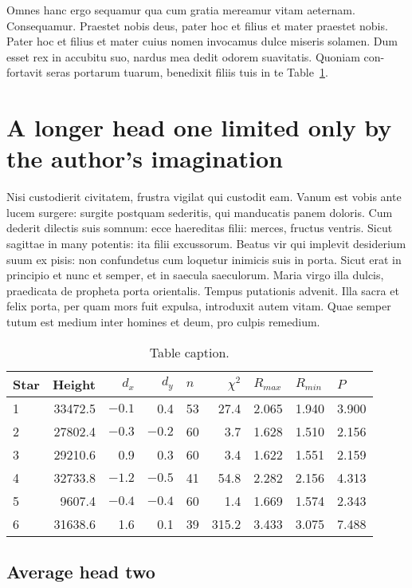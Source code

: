 \documentclass{arkiv}
\begin{document}
Omnes hanc ergo sequamur qua cum gratia mereamur vitam aeternam.
Consequamur. Praestet nobis deus, pater hoc et filius et mater
praestet nobis.  Pater hoc et filius et mater cuius nomen invocamus
dulce miseris solamen. Dum esset rex in accubitu suo, nardus mea
dedit odorem suavitatis. Quoniam con-fortavit seras portarum tuarum,
benedixit filiis tuis in te Table~\ref{tbl-2}.



\section{A longer head one limited only by the author's imagination}

Nisi custodierit civitatem, frustra vigilat qui custodit eam. Vanum
est vobis ante lucem surgere: surgite postquam sederitis, qui
manducatis panem doloris. Cum dederit dilectis suis somnum: ecce
haereditas filii: merces, fructus ventris. Sicut sagittae in many
potentis: ita filii excussorum. Beatus vir qui implevit desiderium
suum ex pisis: non confundetus cum loquetur inimicis suis in porta.
Sicut erat in principio et nunc et semper, et in saecula saeculorum.
Maria virgo illa dulcis, praedicata de propheta porta orientalis.
Tempus putationis advenit.  Illa sacra et felix porta, per quam mors
fuit expulsa, introduxit autem vitam.  Quae semper tutum est medium
inter homines et deum, pro culpis remedium.


\begin{table}
\caption{Table caption.}\label{tbl-2}
\begin{tabular}{lrrrlrlll}
\hline
Star &
Height &
$d_{x}$ &
$d_{y}$ &
$n$ &
$\chi^2$ &
$R_{max}$ &
$R_{min}$ &
$P$  \\
\hline
1 &33472.5 &$-0.1$ &0.4  &53 &27.4 &2.065  &1.940 &3.900\\
2 &27802.4 &$-0.3$ &$-0.2$ &60 &3.7  &1.628  &1.510 &2.156\\
3 &29210.6 &0.9  &0.3  &60 &3.4  &1.622  &1.551 &2.159\\
4 &32733.8 &$-1.2$ &$-0.5$ &41 &54.8 &2.282  &2.156 &4.313\\
5 & 9607.4 &$-0.4$ &$-0.4$ &60 &1.4  &1.669  &1.574 &2.343\\
6 &31638.6 &1.6  &0.1  &39 &315.2 & 3.433 &3.075 &7.488\\
\hline
\end{tabular}
\end{table}


\subsection{Average head two}
\end{document}
